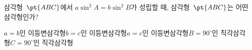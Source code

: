 삼각형~$\pt{ABC}$에서 $a\sin^2 A=b\sin^2 B$가 성립할 때, 삼각형~$\pt{ABC}$는 어떤 삼각형인가?
\begin{choicesv}{$a=b$인 이등변삼각형}{$b=c$인 이등변삼각형}{$a=c$인 이등변삼각형}{$B=90^\circ$인 직각삼각형}{$C=90^\circ$인 직각삼각형}\end{choicesv}
